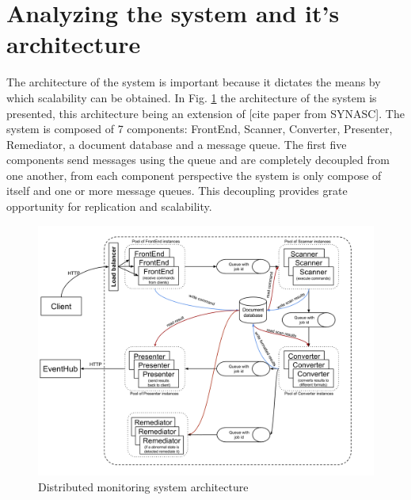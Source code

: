 \section{Analyzing the system and it's architecture}
The architecture of the system is important because it dictates the means by which scalability can be obtained. In Fig. \ref{fig:systemArchitecture} the architecture of the system is presented, this architecture being an extension of [cite paper from SYNASC]. The system is composed of 7 components: FrontEnd, Scanner, Converter, Presenter, Remediator, a document database and a message queue. The first five components send messages using the queue and are completely decoupled from one another, from each component perspective the system is only compose of itself and one or more message queues. This decoupling provides grate opportunity for replication and scalability.

\begin{figure}[ht]
\centering
\includegraphics[width=\linewidth]{./img/MonitoringSystemArchitectureRemediation.png}
\caption{Distributed monitoring system architecture}
\label{fig:systemArchitecture}
\end{figure}

